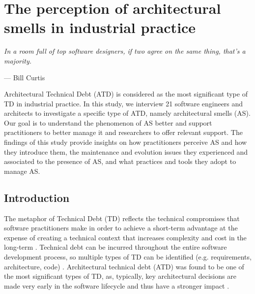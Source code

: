 \setlength{\headheight}{1.2cm}
\renewcommand{\publ}{\flushleft\footnotesize{Based on:\\[0.1cm]
		\textit{D. Sas, I. Pigazzini, P. Avgeriou and F. Arcelli F., "The Perception of Architectural Smells in Industrial Practice," in IEEE Software, vol. 38, no. 6, pp. 35-41, Nov.-Dec. 2021, doi: 10.1109/MS.2021.3103664.} \\[0.1cm]
}}

\chapter{The perception of architectural smells in industrial practice}
\label{chap:3}
\epigraph{\emph{In a room full of top software designers, if two agree on the same thing, that's a majority.}}{--- Bill Curtis}



\begin{Abstract}
	Architectural Technical Debt (ATD) is considered as the most significant type of TD in industrial practice. In this study, we interview 21 software engineers and architects to investigate a specific type of ATD, namely architectural smells (AS). Our goal is to understand the phenomenon of AS better and support practitioners to better manage it and researchers to offer relevant support. The findings of this study provide insights on how practitioners perceive AS and how they introduce them, the maintenance and evolution issues they experienced and associated to the presence of AS, and what practices and tools they adopt to manage AS.
\end{Abstract}

\section{Introduction}\label{c3:introduction}
The metaphor of Technical Debt (TD) reflects the technical compromises that software practitioners make in order to achieve a short-term advantage at the expense of creating a technical context that increases complexity and cost in the long-term \cite{Avgeriou2016}.  
Technical debt can be incurred throughout the entire software development process, so multiple types of TD can be identified (e.g. requirements, architecture, code) \cite{Alves2016}. Architectural technical debt (ATD) was found to be one of the most significant types of TD, as, typically, key architectural decisions are made very early in the software lifecycle and thus have a stronger impact \cite{Ernst2015}.

